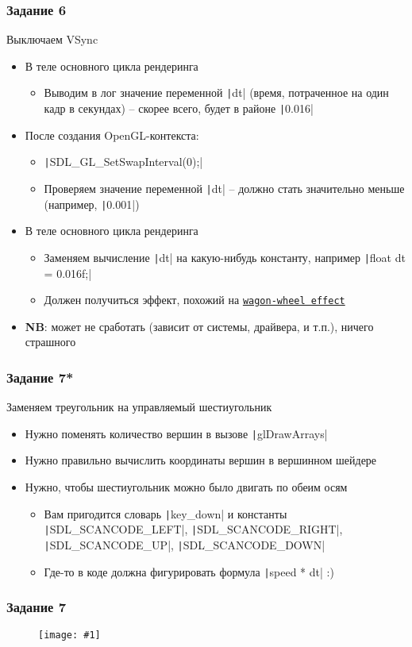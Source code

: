 \documentclass[10pt]{beamer}
\newcommand{\slideimage}[1]{
  \begin{figure}
    \begin{adjustbox}{width=\textwidth, totalheight=\textheight-2\baselineskip-2\baselineskip,keepaspectratio}
      \texttt{[image: \#1]}
    \end{adjustbox}
  \end{figure}
}
\begin{document}
\begin{frame}[fragile]
\frametitle{Задание 6}
Выключаем VSync
\begin{itemize}
\item В теле основного цикла рендеринга
\begin{itemize}
\item Выводим в лог значение переменной \texttt|dt| (время, потраченное на один кадр в секундах) -- скорее всего, будет в районе \texttt|0.016|
\end{itemize}
\item После создания OpenGL-контекста:
\begin{itemize}
\item \texttt|SDL_GL_SetSwapInterval(0);|
\item Проверяем значение переменной \texttt|dt| -- должно стать значительно меньше (например, \texttt|0.001|)
\end{itemize}
\item В теле основного цикла рендеринга
\begin{itemize}
\item Заменяем вычисление \texttt|dt| на какую-нибудь константу, например \texttt|float dt = 0.016f;|
\item Должен получиться эффект, похожий на \href{https://en.wikipedia.org/wiki/Wagon-wheel_effect}{\texttt{wagon-wheel effect}}
\end{itemize}
\item \textbf{\alert{NB}}: может не сработать (зависит от системы, драйвера, и т.п.), ничего страшного
\end{itemize}
\end{frame}

\begin{frame}[fragile]
\frametitle{Задание 7*}
Заменяем треугольник на управляемый шестиугольник
\begin{itemize}
\item Нужно поменять количество вершин в вызове \texttt|glDrawArrays|
\item Нужно правильно вычислить координаты вершин в вершинном шейдере
\item Нужно, чтобы шестиугольник можно было двигать по обеим осям
\begin{itemize}
\item Вам пригодится словарь \texttt|key_down| и константы \texttt|SDL_SCANCODE_LEFT|, \texttt|SDL_SCANCODE_RIGHT|, \texttt|SDL_SCANCODE_UP|, \texttt|SDL_SCANCODE_DOWN|
\item Где-то в коде должна фигурировать формула \texttt|speed * dt| :)
\end{itemize}
\end{itemize}
\end{frame}

\begin{frame}
\frametitle{Задание 7}
\slideimage{7.png}
\end{frame}
\end{document}
